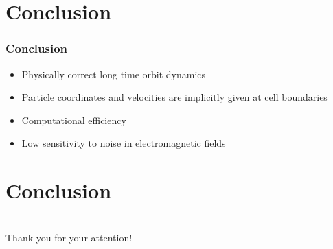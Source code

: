 \documentclass{beamer}
\begin{document}
\section{Conclusion}
\begin{frame}
\frametitle{Conclusion}
\vspace*{-0.5cm}
\begin{itemize}
\item Physically correct long time orbit dynamics
\item Particle coordinates and velocities are implicitly given at cell boundaries
\item Computational efficiency
\item Low sensitivity to noise in electromagnetic fields

\end{itemize}
\end{frame}

\section{Conclusion}



\section{ }
 \begin{frame}
\vspace*{2.5cm}
\centerline{\huge Thank you for your attention!}
 \end{frame}
\end{document}
